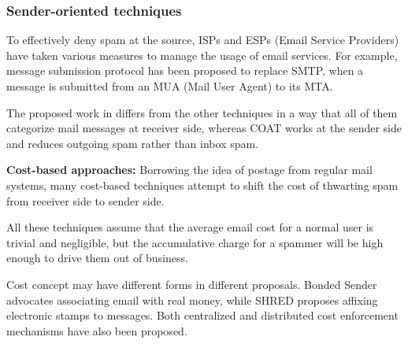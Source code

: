 
\subsubsection{Sender-oriented techniques}

To effectively deny spam at the source,
	ISPs and ESPs (Email Service Providers) have taken various measures to manage the usage of email services.
For example,
	message submission protocol \cite{BibEntry1998Dec} has been proposed to replace SMTP,
	when a message is submitted from an MUA (Mail User Agent) to its MTA.
	
The proposed work in \cite{papasratorn_coat:_2012} differs from the other techniques in a way that all of them categorize mail messages at receiver side,
	whereas COAT works at the sender side and reduces outgoing spam rather than inbox spam.

\textbf{Cost-based approaches:} Borrowing the idea of postage from regular mail systems,
	many cost-based techniques attempt to shift the cost of thwarting spam from receiver side to sender side.

All these techniques assume that the average email cost for a normal user is trivial and negligible,
	but the accumulative charge for a spammer will be high enough to drive them out of business.

Cost concept may have different forms in different proposals.
Bonded Sender \cite{BibEntry2018May} advocates associating email with real money,
	while SHRED \cite{krishnamurthy_shred:_2004} proposes affixing electronic stamps to messages.
Both centralized \cite{krishnamurthy_shred:_2004} and distributed \cite{walsh_distributed_2006} cost enforcement mechanisms have also been proposed.














